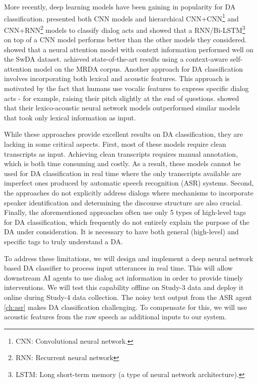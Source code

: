 More recently, deep learning models have been gaining in popularity for DA
classification. \citet{Liu.ea:2017} presented both CNN models and hierarchical
CNN+CNN\footnote{CNN: Convolutional neural network.} and CNN+RNN\footnote{RNN:
Recurrent neural network} models to classify dialog acts and showed that a
RNN/Bi-LSTM\footnote{LSTM: Long short-term memory (a type of neural network
architecture).} on top of a CNN model performs better than the other models
they considered.  \citet{Shen.ea:2016} showed that a neural attention model
with context information performed well on the SwDA dataset.
\citet{Raheja.ea:2019} achieved state-of-the-art results using a context-aware
self-attention model on the MRDA corpus. Another approach for DA classification
involves incorporating both lexical and acoustic features. This approach is
motivated by the fact that humans use vocalic features to express specific
dialog acts - for example, raising their pitch slightly at the end
of questions. \citet{Ortega.ea:2018} showed that their lexico-acoustic neural
network models outperformed similar models that took only lexical information
as input.

While these approaches provide excellent results on DA classification, they are
lacking in some critical aspects.
First, most of these models require clean
transcripts as input. Achieving clean transcripts requires manual annotation,
which is both time consuming and costly. As a result, these models cannot be
used for DA classification in real time where the only transcripts available
are imperfect ones produced by automatic speech recognition (ASR) systems.
Second, the approaches do not explicitly address dialogs where mechanisms to
incorporate speaker identification and determining the discourse structure are
also crucial.
Finally, the aforementioned approaches often use only 5 types of high-level
tags for DA classification, which frequently do not entirely explain the
purpose of the DA under consideration. It is necessary to have both general
(high-level) and specific tags to truly understand a DA.

To address these limitations, we will design and implement a deep neural
network based DA classifier to process input utterances in real time. This will
allow downstream AI agents to use dialog act information in order to provide
timely interventions. We will test this capability offline on Study-3 data and
deploy it online during Study-4 data collection.  The noisy text output from
the ASR agent \autoref{ch:asr} makes DA classification challenging. To
compensate for this, we will use acoustic features from the raw speech as
additional inputs to our system.

